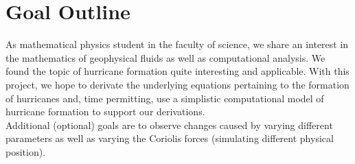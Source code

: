 \chapter{Goal Outline}
As mathematical physics student in the faculty of science, we share an interest in the mathematics of geophysical fluids as well as computational analysis. We found the topic of hurricane formation quite interesting and applicable. With this project, we hope to derivate the underlying equations pertaining to the formation of hurricanes and, time permitting, use a simplistic computational model of hurricane formation to support our derivations.\\
Additional (optional) goals are to observe changes caused by varying different parameters as well as varying the Coriolis forces (simulating different physical position).